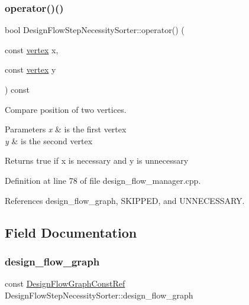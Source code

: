 \subsubsection{\texorpdfstring{operator()()}{operator()()}}
{\footnotesize\ttfamily bool Design\+Flow\+Step\+Necessity\+Sorter\+::operator() (\begin{DoxyParamCaption}\item[{const \hyperlink{graph_8hpp_abefdcf0544e601805af44eca032cca14}{vertex}}]{x,  }\item[{const \hyperlink{graph_8hpp_abefdcf0544e601805af44eca032cca14}{vertex}}]{y }\end{DoxyParamCaption}) const}



Compare position of two vertices. 


\begin{DoxyParams}{Parameters}
{\em x} & is the first vertex \\
\hline
{\em y} & is the second vertex \\
\hline
\end{DoxyParams}
\begin{DoxyReturn}{Returns}
true if x is necessary and y is unnecessary 
\end{DoxyReturn}


Definition at line 78 of file design\+\_\+flow\+\_\+manager.\+cpp.



References design\+\_\+flow\+\_\+graph, S\+K\+I\+P\+P\+ED, and U\+N\+N\+E\+C\+E\+S\+S\+A\+RY.



\subsection{Field Documentation}
\mbox{\label{classDesignFlowStepNecessitySorter_a345a0b022d447f162aed897db3971534}} 
\subsubsection{\texorpdfstring{design\+\_\+flow\+\_\+graph}{design\_flow\_graph}}
{\footnotesize\ttfamily const \hyperlink{design__flow__graph_8hpp_a0230319e566e6824d3d187b6871598f7}{Design\+Flow\+Graph\+Const\+Ref} Design\+Flow\+Step\+Necessity\+Sorter\+::design\+\_\+flow\+\_\+graph\hspace{0.3cm}{\ttfamily [private]}}



